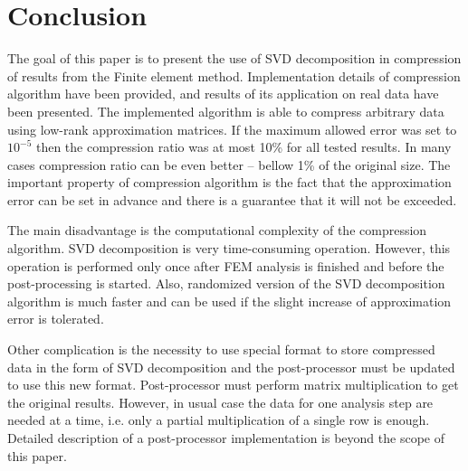 \section{Conclusion}
\label{sec:conclusion}

The goal of this paper is to present the use of SVD decomposition in compression of results from the Finite element method. Implementation details of compression algorithm have been provided, and results of its application on real data have been presented. The implemented algorithm is able to compress arbitrary data using low-rank approximation matrices. If the maximum allowed error was set to $10^{-5}$ then the compression ratio was at most 10\% for all tested results. In many cases compression ratio can be even better -- bellow 1\% of the original size. The important property of compression algorithm is the fact that the approximation error can be set in advance and there is a guarantee that it will not be exceeded.

The main disadvantage is the computational complexity of the compression algorithm. SVD decomposition is very time-consuming operation. However, this operation is performed only once after FEM analysis is finished and before the post-processing is started. Also, randomized version of the SVD decomposition algorithm is much faster and can be used if the slight increase of approximation error is tolerated.

Other complication is the necessity to use special format to store compressed data in the form of SVD decomposition and the post-processor must be updated to use this new format. Post-processor must perform matrix multiplication to get the original results. However, in usual case the data for one analysis step are needed at a time, i.e. only a partial multiplication of a single row is enough. Detailed description of a post-processor implementation is beyond the scope of this paper.
